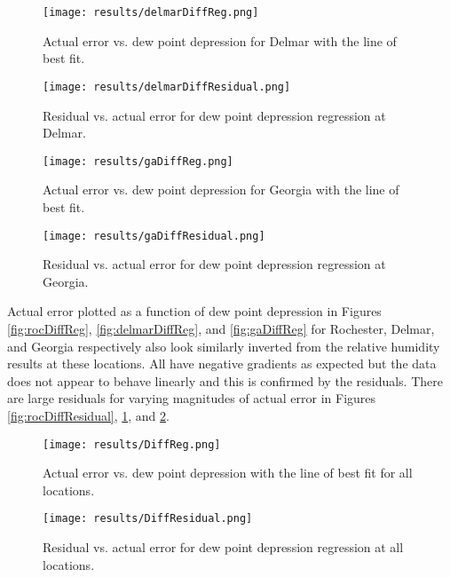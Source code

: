 \documentclass{book}
\begin{document}
\begin{figure}[H]
\begin{minipage}[b]{0.47\textwidth}
\centering
\texttt{[image: results/delmarDiffReg.png]}
\caption{Actual error vs. dew point depression for Delmar with the line of best fit.}
\label{fig:delmarDiffReg}
\end{minipage}
\begin{minipage}[b]{0.47\textwidth}
\centering
\texttt{[image: results/delmarDiffResidual.png]}
\caption{Residual vs. actual error for dew point depression regression at Delmar.}
\label{fig:delmarDiffResidual}
\end{minipage}
\end{figure}

\begin{figure}[H]
\begin{minipage}[b]{0.47\textwidth}
\centering
\texttt{[image: results/gaDiffReg.png]}
\caption{Actual error vs. dew point depression for Georgia with the line of best fit.}
\label{fig:gaDiffReg}
\end{minipage}
\begin{minipage}[b]{0.47\textwidth}
\centering
\texttt{[image: results/gaDiffResidual.png]}
\caption{Residual vs. actual error for dew point depression regression at Georgia.}
\label{fig:gaDiffResidual}
\end{minipage}
\end{figure}

Actual error plotted as a function of dew point depression in Figures \ref{fig:rocDiffReg}, \ref{fig:delmarDiffReg}, and \ref{fig:gaDiffReg} for Rochester, Delmar, and Georgia respectively also look similarly inverted from the relative humidity results at these locations.  All have negative gradients as expected but the data does not appear to behave linearly and this is confirmed by the residuals.  There are large residuals for varying magnitudes of actual error in Figures \ref{fig:rocDiffResidual}, \ref{fig:delmarDiffResidual}, and \ref{fig:gaDiffResidual}.

\begin{figure}[H]
\begin{minipage}[b]{0.47\textwidth}
\centering
\texttt{[image: results/DiffReg.png]}
\caption{Actual error vs. dew point depression with the line of best fit for all locations.}
\label{fig:DiffReg}
\end{minipage}
\begin{minipage}[b]{0.47\textwidth}
\centering
\texttt{[image: results/DiffResidual.png]}
\caption{Residual vs. actual error for dew point depression regression at all \\ locations.}
\label{fig:DiffResidual}
\end{minipage}
\end{figure}
\end{document}
